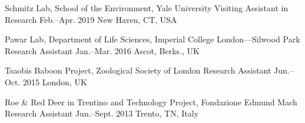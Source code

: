 \begin{cventries}
  \cventry
    {Schmitz Lab, School of the Environment, Yale University} %
    {Visiting Assistant in Research} %
    {Feb.--Apr. 2019} %
    {New Haven, CT, USA} %
    {}

    
  \cventry
    {Pawar Lab, Department of Life Sciences, Imperial College London---Silwood Park} %
    {Research Assistant} %
    {Jan.--Mar. 2016} %
    {Ascot, Berks., UK} %
    {}

    
  \cventry
    {Tsaobis Baboon Project, Zoological Society of London} %
    {Research Assistant} %
    {Jun.--Oct. 2015} %
    {London, UK} %
    {}

    
  \cventry
    {Roe \& Red Deer in Trentino and Technology Project, Fondazione Edmund Mach} %
    {Research Assistant} %
    {Jun.--Sept. 2013} %
    {Trento, TN, Italy} %
    {}


\end{cventries}
